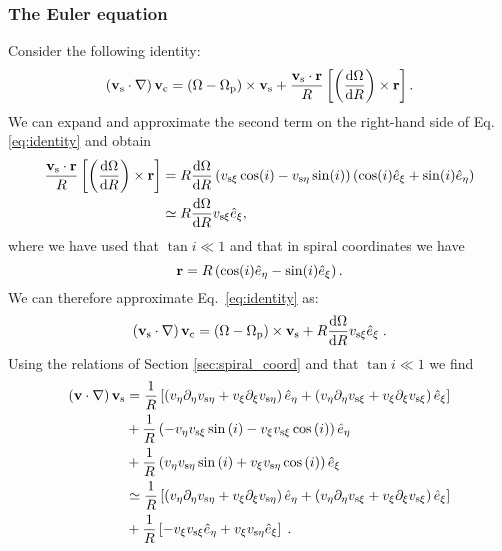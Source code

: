 \documentclass[useAMS,usenatbib]{mn2e}
\def\pa{\partial}
\begin{document}
\subsubsection{The Euler equation}
%
Consider the following identity:
%
\begin{equation} \label{eq:identity}
\left( \mathbf{v}_{\rm s} \cdot \nabla \right) \mathbf{v}_{\rm c} = \left( {\Omega} - {\Omega}_{\rm p} \right) \times \mathbf{v}_{\rm s} + \frac{\mathbf{v}_{\rm s} \cdot \mathbf{r} }{R} \left[ \left( \frac{\mathrm{d} {\Omega}}{\mathrm{d} R} \right) \times \mathbf{r} \right].
\end{equation}
%
We can expand and approximate the second term on the right-hand side of Eq. \eqref{eq:identity} and obtain
%
\begin{align}
\frac{\mathbf{v}_{\rm s} \cdot \mathbf{r} }{R} \left[ \left( \frac{\mathrm{d} {\Omega}}{\mathrm{d} R} \right) \times \mathbf{r} \right] & = R \frac{\mathrm{d} \Omega}{\mathrm{d} R} \left( v_{{\rm s} \xi} \cos(i) - v_{{\rm s} \eta} \sin(i) \right)  \left( \cos(i) \hat{e}_{\xi} + \sin(i) \hat{e}_{\eta} \right) \\
& \simeq R \frac{\mathrm{d} \Omega}{\mathrm{d} R} v_{{\rm s} \xi}  \hat{e}_{\xi},
\end{align}
%
where we have used that $\tan i \ll 1$ and that in spiral coordinates we have
%
\begin{equation}
\mathbf{r} = R \left( \cos(i) \hat{e}_{\eta} - \sin(i) \hat{e}_{\xi} \right).
\end{equation}
%
We can therefore approximate Eq.~\eqref{eq:identity} as:
%
\begin{equation}
\label{eq:vdotnablavc2}
\left( \mathbf{v}_{\rm s} \cdot \nabla \right) \mathbf{v}_{\rm c}= \left( {\Omega} - {\Omega}_{\rm p} \right) \times \mathbf{v}_{\rm s}+R \frac{\mathrm{d} \Omega}{\mathrm{d} R} v_{{\rm s} \xi}  \hat{e}_{\xi} \;.
\end{equation}
%
Using the relations of Section \ref{sec:spiral_coord} and that $\tan i \ll 1$ we find
\begin{align}
\left( \bfv \cdot \nabla \right) \bfv_{\rm s} &= \frac{1}{R}\left[\left(v_\eta\pa_\eta v_{\rm s\eta}+v_\xi\pa_\xi v_{\rm s\eta}\right)\hat{e}_{\eta}+\left(v_\eta\pa_\eta v_{\rm s\xi}+v_\xi\pa_\xi v_{\rm s\xi}\right)\hat{e}_{\xi}\right] \nonumber \\
& +\frac{1}{R}\left(-v_\eta v_{\rm s\xi}\sin\left(i\right)-v_\xi v_{\rm s\xi}\cos\left(i\right)\right)\hat{e}_\eta \nonumber \\
&+ \frac{1}{R}\left(v_\eta v_{\rm s\eta}\sin\left(i\right)+v_\xi v_{\rm s\eta}\cos\left(i\right)\right)\hat{e}_\xi  \\
& \simeq \frac{1}{R}\left[\left(v_\eta\pa_\eta v_{\rm s\eta}+v_\xi\pa_\xi v_{\rm s\eta}\right)\hat{e}_{\eta}+\left(v_\eta\pa_\eta v_{\rm s\xi}+v_\xi\pa_\xi v_{\rm s\xi}\right)\hat{e}_{\xi}\right] \nonumber \\
& +\frac{1}{R}\left[-v_\xi v_{\rm s\xi}\hat{e}_\eta+ v_\xi v_{\rm s\eta}\hat{e}_\xi\right] \;.
\end{align}
\end{document}
